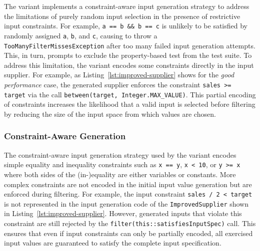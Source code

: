 The \textbf{\VariantImproved{}} variant implements
a constraint-aware input generation strategy
to address the limitations of purely random input selection
in the presence of restrictive input constraints.
For example, \texttt{a == b \&\& b == c}
is unlikely to be satisfied by randomly assigned \texttt{a}, \texttt{b}, and \texttt{c}, causing \ToolJqwik{}
to throw a \texttt{Too\-Many\-Filter\-Misses\-Exception} after too many
failed input generation attempts.
This, in turn, prompts \ToolTeralizer{}
to exclude the property-based test from the test suite.
To address this limitation,
the \VariantImproved{} variant encodes some constraints directly in the input supplier.
For example, as Listing~\ref{lst:improved-supplier} shows for the \textit{good performance} case,
the generated supplier enforces the constraint \texttt{sales >= target}
via the call \texttt{between(target, Integer.MAX\_VALUE)}.
This partial encoding of constraints
increases the likelihood that a valid input is selected before filtering
by reducing the size of the input space from which values are chosen.

\subsubsection{Constraint-Aware Generation}
\label{sec:constraint-encoding}

The constraint-aware input generation strategy
used by the \VariantImproved{} variant
encodes simple equality and inequality constraints
such as \texttt{x == y}, \texttt{x < 10}, or \texttt{y >= x}
where both sides of the (in-)equality are either variables or constants.
More complex constraints are not encoded in the initial input value generation
but are enforced during filtering.
For example, the input constraint \texttt{sales / 2 < target}
is not represented in the input generation code of the \texttt{ImprovedSupplier}
shown in Listing~\ref{lst:improved-supplier}.
However, generated inputs that violate this constraint
are still rejected by the \texttt{filter(this::satisfiesInputSpec)} call.
This ensures that even if input constraints can only be partially encoded,
all exercised input values are guaranteed to satisfy the complete input specification.

